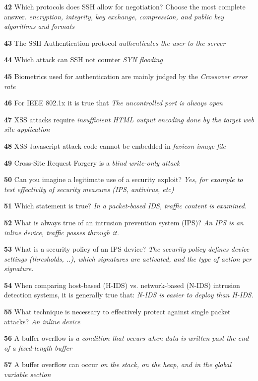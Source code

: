\textbf{  42}  Which protocols does SSH allow for negotiation? Choose the most complete answer.  
\textit{ encryption, integrity, key exchange, compression, and public key algorithms and formats}

\textbf{  43}  The SSH-Authentication protocol  
\textit{ authenticates the user to the server}

\textbf{  44}  Which attack can SSH not counter  
\textit{ SYN flooding}

\textbf{  45}  Biometrics used for authentication are mainly judged by the  
\textit{ Crossover error rate}

\textbf{  46}  For IEEE 802.1x it is true that  
\textit{ The uncontrolled port is always open}

\textbf{  47}  XSS attacks require  
\textit{ insufficient HTML output encoding done by the target web site application}

\textbf{  48}  XSS Javascript attack code cannot be embedded in  
\textit{ favicon image file}

\textbf{  49}  Cross-Site Request Forgery is a  
\textit{ blind write-only attack}

\textbf{  50}  Can you imagine a legitimate use of a security exploit?  
\textit{ Yes, for example to test effectivity of security measures (IPS, antivirus, etc)}

\textbf{  51}  Which statement is true?  
\textit{ In a packet-based IDS, traffic content is examined.}

\textbf{  52}  What is always true of an intrusion prevention system (IPS)?  
\textit{ An IPS is an inline device, traffic passes through it.}

\textbf{  53}  What is a security policy of an IPS device?  
\textit{ The security policy defines device settings (thresholds, ..), which signatures are activated, and the type of action per signature.}

\textbf{  54}  When comparing host-based (H-IDS) vs. network-based (N-IDS) intrusion detection systems, it is generally true that: 
\textit{ N-IDS is easier to deploy than H-IDS.}

\textbf{  55}  What technique is necessary to effectively protect against single packet attacks?  
\textit{ An inline device}

\textbf{  56}  A buffer overflow is  
\textit{ a condition that occurs when data is written past the end of a fixed-length buffer}

\textbf{  57}  A buffer overflow can occur  
\textit{ on the stack, on the heap, and in the global variable section}

